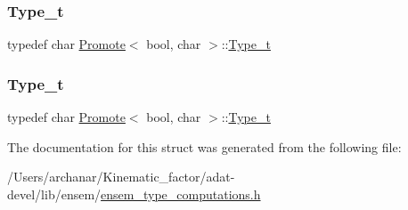 \subsubsection{\texorpdfstring{Type\_t}{Type\_t}\hspace{0.1cm}{\footnotesize\ttfamily [2/3]}}
{\footnotesize\ttfamily typedef char \mbox{\hyperlink{structPromote}{Promote}}$<$ bool, char $>$\+::\mbox{\hyperlink{structPromote_3_01bool_00_01char_01_4_ae241f014309954a164eb7d94f35e3adc}{Type\+\_\+t}}}

\mbox{\label{structPromote_3_01bool_00_01char_01_4_ae241f014309954a164eb7d94f35e3adc}} 
\subsubsection{\texorpdfstring{Type\_t}{Type\_t}\hspace{0.1cm}{\footnotesize\ttfamily [3/3]}}
{\footnotesize\ttfamily typedef char \mbox{\hyperlink{structPromote}{Promote}}$<$ bool, char $>$\+::\mbox{\hyperlink{structPromote_3_01bool_00_01char_01_4_ae241f014309954a164eb7d94f35e3adc}{Type\+\_\+t}}}



The documentation for this struct was generated from the following file\+:\begin{DoxyCompactItemize}
\item 
/\+Users/archanar/\+Kinematic\+\_\+factor/adat-\/devel/lib/ensem/\mbox{\hyperlink{adat-devel_2lib_2ensem_2ensem__type__computations_8h}{ensem\+\_\+type\+\_\+computations.\+h}}\end{DoxyCompactItemize}
